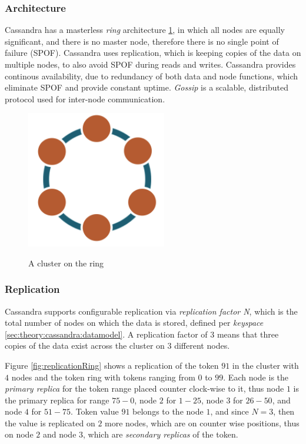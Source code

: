 \subsubsection{Architecture}
Cassandra has a masterless \emph{ring} architecture \ref{fig:archCluster}, in which all nodes are equally significant, and there is no master node, therefore there is no single point of failure (SPOF). Cassandra uses replication, which is keeping copies of the data on multiple nodes, to also avoid SPOF during reads and writes. Cassandra provides continous availability, due to redundancy of both data and node functions, which eliminate SPOF and provide constant uptime.
\emph{Gossip} is a scalable, distributed protocol used for inter-node communication.

\begin{figure}[h]
	\centering
	\label{fig:archClusterA}\includegraphics[height=60mm]{images/cassandra-ring.png}\hspace{10mm}
	\label{fig:archCluster}
	\caption{A cluster on the ring}
\end{figure}

\subsubsection{Replication}
Cassandra supports configurable replication via \emph{replication factor N}, which is the total number of nodes on which the data is stored, defined per \emph{keyspace} \ref{sec:theory:cassandra:datamodel}. A replication factor of $3$ means that three copies of the data exist across the cluster on $3$ different nodes.

Figure \ref{fig:replicationRing} shows a replication of the token $91$ in the cluster with $4$ nodes and the token ring with tokens ranging from $0$ to $99$. 
Each node is the \emph{primary replica} for the token range placed counter clock-wise to it, thus node $1$ is the primary replica for range $75-0$, node $2$ for $1-25$, node $3$ for $26-50$, and node $4$ for $51-75$. 
Token value $91$ belongs to the node $1$, and since $N=3$, then the value is replicated on $2$ more nodes, which are on counter wise positions, thus on node $2$ and node $3$, which are \emph{secondary replicas} of the token. 

